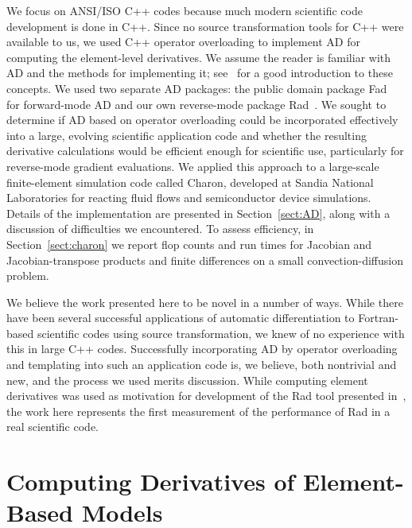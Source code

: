 \documentclass{llncs}
\begin{document}
We focus on ANSI/ISO C++ codes because much
modern scientific code development is done in C++.
Since no source transformation tools for C++ were available to
us, we used C++ operator overloading
to implement AD for computing the element-level derivatives.
We assume the
reader is familiar with AD and the
methods for implementing it; see~\cite{Griewank2000EDP} for a good
introduction to these concepts.  We used two
separate AD packages: the public domain package Fad~\cite{Aubert2001ADi} for
forward-mode AD and our own reverse-mode package Rad~\cite{Gay2005SDf}.
We sought to determine if AD based on
operator overloading could be incorporated effectively into a
large, evolving scientific application code and whether the resulting
derivative calculations would be efficient enough for scientific use,
particularly for reverse-mode gradient evaluations.  We
applied this approach to a large-scale finite-element simulation code called Charon,
developed at Sandia
National Laboratories for reacting fluid flows and
semiconductor device simulations.  Details of the implementation are
presented in Section~\ref{sect:AD}, along with a discussion of
difficulties we encountered.  To
assess efficiency, in Section~\ref{sect:charon} we report
flop counts and run times for Jacobian and Jacobian-transpose
products and finite differences on a small convection-diffusion
problem.

We believe the work presented here to be novel in a number of ways.
While there have been several successful applications of automatic
differentiation to Fortran-based scientific codes using source
transformation, we knew of no experience with this in large C++
codes.  Successfully incorporating AD by operator
overloading and templating into such an application code is,
we believe, both nontrivial
and new, and the process we used merits discussion.  While
computing element derivatives was used as motivation for development
of the Rad tool presented in~\cite{Gay2005SDf}, the work here
represents the first measurement of the performance of Rad in a real
scientific code.

\section{Computing Derivatives of Element-Based Models}
\label{sect:element}
\end{document}
